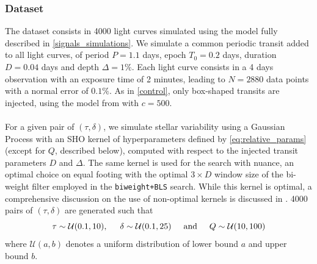 \documentclass{aastex631}
\newcommand{\wtls}{\texttt{biweight+BLS}}
\begin{document}

\subsubsection*{Dataset}\label{sim_dataset}
The dataset consists in 4000 light curves simulated using the model fully described in \autoref{signals_simulations}. We simulate a common periodic transit added to all light curves, of period $P=1.1$ days, epoch $T_0=0.2$ days, duration $D=0.04$ days and depth $\Delta=1\%$. Each light curve consists in a 4 days observation with an exposure time of 2 minutes, leading to $N=2880$ data points with a normal error of $0.1\%$. As in \autoref{control}, only box-shaped transits are injected, using the model from \cite{protopapas} with $c=500$.
\\\\
For a given pair of $(\tau, \delta)$, we simulate stellar variability using a Gaussian Process with an SHO kernel of hyperparameters defined by \autoref{eq:relative_params} (except for $Q$, described below), computed with respect to the injected transit parameters $D$ and $\Delta$. The same kernel is used for the search with \textsf{nuance}, an optimal choice on equal footing with the optimal $3\times D$ window size of the bi-weight filter employed in the \wtls{} search. While this kernel is optimal, a comprehensive discussion on the use of non-optimal kernels is discussed in . 4000 pairs of $(\tau, \delta)$ are generated such that
\begin{equation*}
    \tau \sim \mathcal{U}(0.1, 10), \hspace{0.5cm} \delta \sim \mathcal{U}(0.1, 25) \hspace{0.5cm}\text{and}\hspace{0.5cm} Q \sim \mathcal{U}(10, 100)
\end{equation*}
where $\mathcal{U}(a, b)$ denotes a uniform distribution of lower bound $a$ and upper bound $b$.
\end{document}
